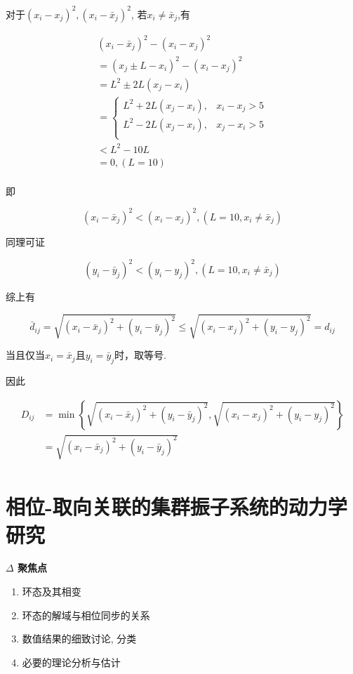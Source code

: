 \documentclass{article}
\begin{document}
对于$(x_i-x_j)^2, (x_i-\bar{x}_j)^2$, 若$x_i\ne \bar{x}_j$,有

$$
\begin{array}{l}
	(x_i-\bar{x}_j)^2-(x_i-x_j)^2\\
	=\left( x_j\pm L-x_i \right) ^2-(x_i-x_j)^2\\
	=L^2\pm 2L\left( x_j-x_i \right)\\
	=\left\{ \begin{matrix}
	L^2+2L\left( x_j-x_i \right) ,&		x_i-x_j>5\\
	L^2-2L\left( x_j-x_i \right) ,&		x_j-x_i>5\\
\end{matrix} \right.\\
	<L^2-10L\\
	=0, \left( L=10 \right)\\
\end{array}
$$

即

$$
(x_i-\bar{x}_j)^2<(x_i-x_j)^2, \left( L=10, x_i\ne \bar{x}_j \right)
$$

同理可证

$$
(y_i-\bar{y}_j)^2<(y_i-y_j)^2, \left( L=10, x_i\ne \bar{x}_j \right)
$$

综上有

$$
\bar{d}_{ij}=\sqrt{(x_i-\bar{x}_j)^2+(y_i-\bar{y}_j)^2}\le \sqrt{(x_i-x_j)^2+(y_i-y_j)^2}=d_{ij}
$$

当且仅当$x_i=\bar{x}_j$且$y_i=\bar{y}_j$时，取等号.

因此

$$
\begin{aligned}
	D_{ij}&=\min \left\{ \sqrt{(x_i-\bar{x}_j)^2+(y_i-\bar{y}_j)^2},\sqrt{(x_i-x_j)^2+(y_i-y_j)^2} \right\}\\
	&=\sqrt{(x_i-\bar{x}_j)^2+(y_i-\bar{y}_j)^2}\\
\end{aligned}
$$

\newpage

\section{相位-取向关联的集群振子系统的动力学研究}

\textbf{$\Delta$ 聚焦点}
\begin{enumerate}
    \item 环态及其相变
    \item 环态的解域与相位同步的关系
    \item 数值结果的细致讨论, 分类
    \item 必要的理论分析与估计
\end{enumerate}
\end{document}
